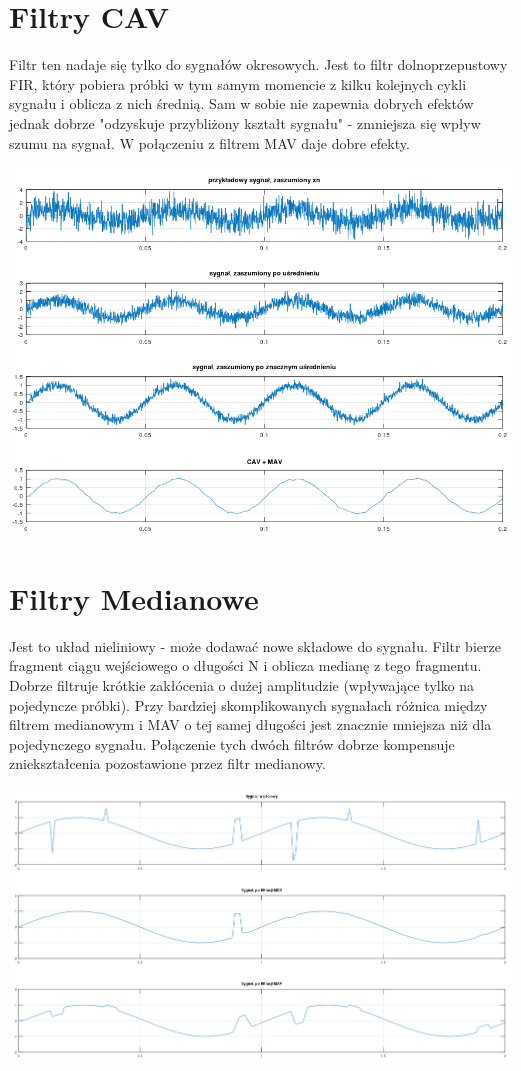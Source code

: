 \documentclass[11pt]{article}
\begin{document}
\section{Filtry CAV}
Filtr ten nadaje się tylko do sygnałów okresowych. Jest to filtr dolnoprzepustowy FIR, który pobiera próbki w tym samym momencie z kilku kolejnych cykli sygnału i oblicza z nich średnią. Sam w sobie nie zapewnia dobrych efektów jednak dobrze "odzyskuje przybliżony kształt sygnału" - zmniejsza się wpływ szumu na sygnał. W połączeniu z filtrem MAV daje dobre efekty.
\begin{center}
\includegraphics[width=15cm]{cav.png}
\end{center}

\section{Filtry Medianowe}
Jest to układ nieliniowy - może dodawać nowe składowe do sygnału.\newline
Filtr bierze fragment ciągu wejściowego o długości N i oblicza medianę z tego fragmentu. Dobrze filtruje krótkie zakłócenia o dużej amplitudzie (wpływające tylko na pojedyncze próbki). Przy bardziej skomplikowanych sygnałach różnica między filtrem medianowym i MAV o tej samej długości jest znacznie mniejsza niż dla pojedynczego sygnału. Połączenie tych dwóch filtrów dobrze kompensuje zniekształcenia pozostawione przez filtr medianowy.
\begin{center}
	\includegraphics[width=15cm]{med1.png}
\end{center}
\end{document}
